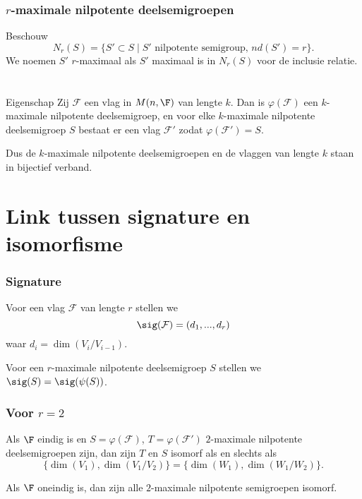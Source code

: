 \begin{frame}
\frametitle{$r$-maximale nilpotente deelsemigroepen}

\begin{block}{}
Beschouw
$$N_r(S) = \{ S' \subset S \; | \; S' \text{ nilpotente semigroup, } nd(S') = r\}.$$
We noemen $S'$ $r$-maximaal als $S'$ maximaal is in $N_r(S)$ voor de inclusie relatie. 
\end{block}

\end{frame}


\begin{frame}
\frametitle{ $ $ }

\begin{block}{Eigenschap}
Zij $\mathcal{F}$ een vlag in $M(n,\F)$ van lengte $k$. Dan is $\varphi (\mathcal{F})$ een $k$-maximale nilpotente deelsemigroep, en voor elke $k$-maximale nilpotente deelsemigroep $S$ bestaat er een vlag $\mathcal{F'}$ zodat $\varphi (\mathcal{F}') = S$.
\end{block}

\begin{block}{}
Dus de $k$-maximale nilpotente deelsemigroepen en de vlaggen van lengte $k$ staan in bijectief verband.
\end{block}

\end{frame}


\section{Link tussen signature en isomorfisme}

\begin{frame}
\frametitle{Signature}

\begin{block}{}
Voor een vlag $\mathcal{F}$ van lengte $r$ stellen we 
$$\sig(\mathcal{F}) = (d_1, ..., d_r)$$
waar $d_i = \dim(V_i/V_{i-1})$.
\end{block}

\begin{block}{}
Voor een $r$-maximale nilpotente deelsemigroep $S$ stellen we $\sig(S) = \sig(\psi(S))$.
\end{block}

\end{frame}


\begin{frame}
\frametitle{Voor $r = 2$}

\begin{block}{}
Als $\F$ eindig is en $S = \varphi(\mathcal{F})$, $T = \varphi(\mathcal{F'})$ $2$-maximale nilpotente deelsemigroepen zijn, dan zijn $T$ en $S$ isomorf als en slechts als 
$$\{ \dim (V_1), \dim (V_1/V_2) \} = \{ \dim (W_1), \dim (W_1/W_2) \}.$$
\end{block}

\begin{block}{}
Als $\F$ oneindig is, dan zijn alle $2$-maximale nilpotente semigroepen isomorf.
\end{block}

\end{frame}

